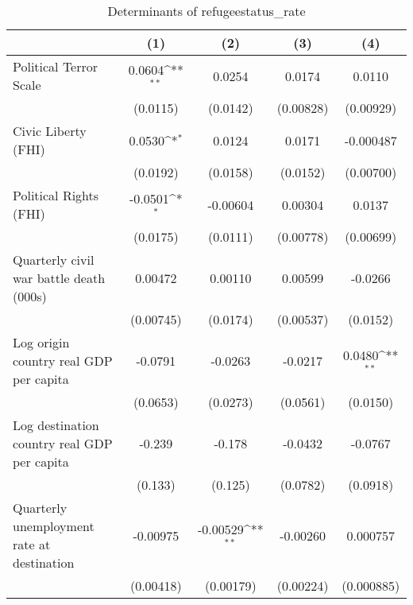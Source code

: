 \begin{table}[htbp]\centering
\def\sym#1{\ifmmode^{#1}\else\(^{#1}\)\fi}
\caption{Determinants of refugeestatus\_rate}
\begin{tabular}{l*{4}{c}}
\hline\hline
                    &\multicolumn{1}{c}{(1)}         &\multicolumn{1}{c}{(2)}         &\multicolumn{1}{c}{(3)}         &\multicolumn{1}{c}{(4)}         \\
\hline
Political Terror Scale&      0.0604\sym{**} &      0.0254         &      0.0174         &      0.0110         \\
                    &    (0.0115)         &    (0.0142)         &   (0.00828)         &   (0.00929)         \\
[1em]
Civic Liberty (FHI) &      0.0530\sym{*}  &      0.0124         &      0.0171         &   -0.000487         \\
                    &    (0.0192)         &    (0.0158)         &    (0.0152)         &   (0.00700)         \\
[1em]
Political Rights (FHI)&     -0.0501\sym{*}  &    -0.00604         &     0.00304         &      0.0137         \\
                    &    (0.0175)         &    (0.0111)         &   (0.00778)         &   (0.00699)         \\
[1em]
Quarterly civil war battle death (000s)&     0.00472         &     0.00110         &     0.00599         &     -0.0266         \\
                    &   (0.00745)         &    (0.0174)         &   (0.00537)         &    (0.0152)         \\
[1em]
Log origin country real GDP per capita&     -0.0791         &     -0.0263         &     -0.0217         &      0.0480\sym{**} \\
                    &    (0.0653)         &    (0.0273)         &    (0.0561)         &    (0.0150)         \\
[1em]
Log destination country real GDP per capita&      -0.239         &      -0.178         &     -0.0432         &     -0.0767         \\
                    &     (0.133)         &     (0.125)         &    (0.0782)         &    (0.0918)         \\
[1em]
Quarterly unemployment rate at destination&    -0.00975         &    -0.00529\sym{**} &    -0.00260         &    0.000757         \\
                    &   (0.00418)         &   (0.00179)         &   (0.00224)         &  (0.000885)         \\

\end{tabular}
\end{table}
